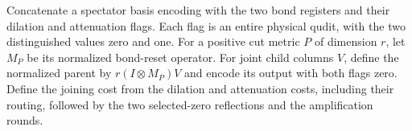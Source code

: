 \begin{definition}
    \label{def:mpu_encoded_merging}
    \leanok
    Concatenate a spectator basis encoding with the two bond registers
    and their dilation and attenuation flags. Each flag is an entire
    physical qudit, with the two distinguished values zero and one.
    For a positive cut metric $P$ of dimension $r$, let $M_P$ be its
    normalized bond-reset operator. For joint child columns $V$, define
    the normalized parent by $r(I\otimes M_P)V$ and encode its output
    with both flags zero. Define the joining cost from the
    dilation and attenuation costs, including their routing, followed
    by the two selected-zero reflections and the amplification rounds.
\end{definition}

